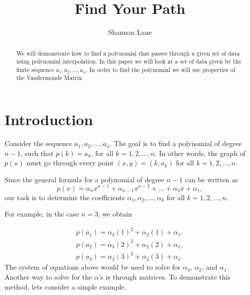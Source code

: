 \documentclass[12pt]{amsart}
\begin{document}
 
\title{Find Your Path}
\author {Shannon Lane}
 
\begin{abstract}
We will demonstrate how to find a polynomial that passes through a given set of data using polynomial interpolation. %
In this paper we will look at a set of data given by the finite sequence $a_1, a_2,\hdots,a_n$. In order to find the polynomial we will use properties of the Vandermonde Matrix.
 
\end{abstract}
 
\maketitle
 
\section{Introduction}
Consider the sequence $a_1, a_2,\hdots, a_n$. The goal is to find a polynomial of degree $n-1$, such that $p(k)=a_k$, for all $k=1, 2,\hdots,n.$ In other words, the graph of $p(x)$ must go through every point $(x,y)=(k,a_k)$ for all $k=1, 2,\hdots,n$.
 
\indent Since the general formula for a polynomial of degree $n-1$ can be written as
\begin{equation}
p(x)=\alpha_{n}x^{n-1}+\alpha_{n-1}x^{n-2}+\hdots+\alpha_2x+\alpha_1,
\end{equation}
our task is to determine the coefficients $\alpha_1, \alpha_2,\hdots, \alpha_k$ for all $k=1, 2,\hdots,n$.
 
\indent For example, in the case $n=3$, we obtain
 
 
\begin{equation*}
\begin{array}{l}
p(a_1)=\alpha_3(1)^2+\alpha_2(1)+\alpha_1 ,\\
p(a_2)=\alpha_3(2)^2+\alpha_2(2)+\alpha_1 ,\\
p(a_3)=\alpha_3(3)^2+\alpha_2(3)+\alpha_1.
\end{array}
\end{equation*}
The system of equations above would be used to solve for $\alpha_3$, $\alpha_2$, and $\alpha_1$. Another way to solve for the $\alpha$'s is through matrices. To demonstrate this method, lets consider a simple example.
 
\end{document}
